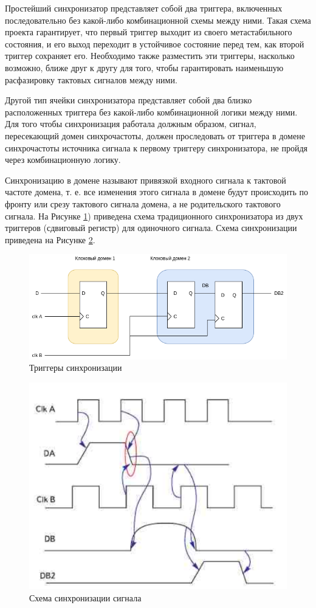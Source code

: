 Простейший синхронизатор представляет собой два триггера, включенных последовательно без какой-либо комбинационной схемы между ними. Такая схема проекта гарантирует, что первый триггер выходит из своего метастабильного состояния, и его выход переходит в устойчивое состояние перед тем, как второй триггер сохраняет его. Необходимо также разместить эти триггеры, насколько возможно, ближе друг к другу для того, чтобы гарантировать наименьшую расфазировку тактовых сигналов между ними. 

Другой тип ячейки синхронизатора представляет собой два близко расположенных триггера без какой-либо комбинационной логики между ними. Для того чтобы синхронизация работала должным образом, сигнал, пересекающий домен синхрочастоты, должен проследовать от триггера в домене синхрочастоты источника сигнала к первому триггеру синхронизатора, не пройдя через комбинационную логику.

Синхронизацию в домене называют привязкой входного сигнала к тактовой частоте
домена, т. е. все изменения этого сигнала в домене будут происходить по фронту или срезу
тактового сигнала домена, а не родительского тактового сигнала. На Рисунке \ref{fig:sync-triggers}) приведена схема традиционного синхронизатора из
двух триггеров (сдвиговый регистр) для одиночного сигнала. Схема синхронизации приведена на Рисунке \ref {fig:sync-scheme}.

\begin{figure}[h!]
	\centering
	\includegraphics[width=0.6\linewidth]{course-scheme/images/sync-triggers}
	\caption{Триггеры синхронизации}
	\label{fig:sync-triggers}
\end{figure}

\begin{figure}[h!]
	\centering
	\includegraphics[width=0.3\linewidth]{course-scheme/images/sync-scheme}
	\caption{Схема синхронизации сигнала}
	\label{fig:sync-scheme}
\end{figure}

